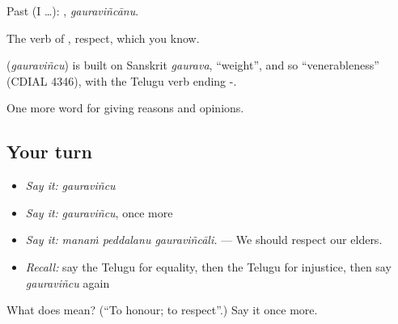 Past (I …): , \emph{gauraviñcānu}.

The verb of , respect, which you know.

\begin{cousinweb}
\textbf{} (\emph{gauraviñcu}) is built on Sanskrit \emph{gaurava}, \textquotedblleft{}weight\textquotedblright{}, and so \textquotedblleft{}venerableness\textquotedblright{} (CDIAL 4346), with the Telugu verb ending -.
\end{cousinweb}

\begin{grammarlens}[title={What you've built}]
One more word for giving reasons and opinions.
\end{grammarlens}

\subsection*{Your turn}
\begin{itemize}
\raggedright
  \item \emph{Say it:} \emph{gauraviñcu}
  \item \emph{Say it:} \emph{gauraviñcu}, once more
  \item \emph{Say it:} \emph{manaṁ peddalanu gauraviñcāli.} — We should respect our elders.
  \item \emph{Recall:} say the Telugu for equality, then the Telugu for injustice, then say \emph{gauraviñcu} again
\end{itemize}

\begin{tcolorbox}[breakable,colback=teal!4,colframe=teal!35!black,title={Before you move on}]
What does  mean? (\textquotedblleft{}To honour; to respect\textquotedblright{}.) Say it once more.
\end{tcolorbox}

